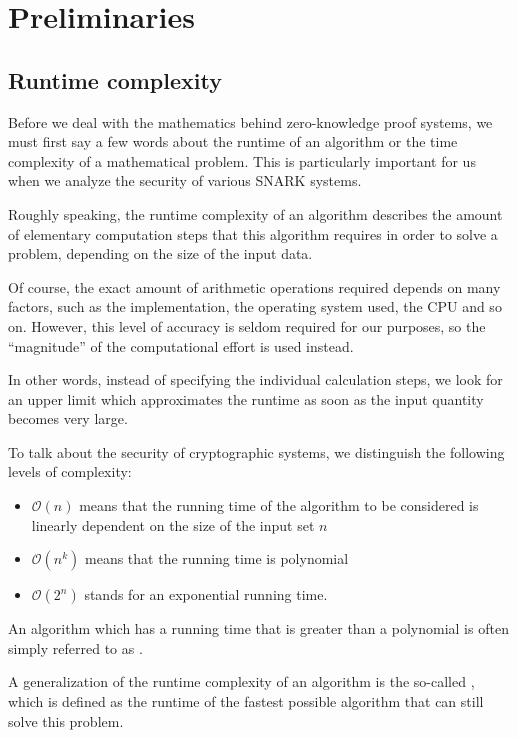 \chapter{Preliminaries}

\section{Runtime complexity}

Before we deal with the mathematics behind zero-knowledge proof systems, we must first say a few words about the runtime of an algorithm or the time complexity of a mathematical problem. This is particularly important for us when we analyze the security of various SNARK systems.

Roughly speaking, the runtime complexity of an algorithm describes the amount of elementary computation steps that this algorithm requires in order to solve a problem, depending on the size of the input data.

Of course, the exact amount of arithmetic operations required depends on many factors, such as the implementation, the operating system used, the CPU and so on. However, this level of accuracy is seldom required for our purposes, so the ``magnitude'' of the computational effort is used instead.

In other words, instead of specifying the individual calculation steps, we look for an upper limit which approximates the runtime as soon as the input quantity becomes very large. 

To talk about the security of cryptographic systems, we distinguish the following levels of complexity:
\begin{itemize}
\item $\mathcal{O}(n)$ means that the running time of the algorithm to be considered is linearly dependent on the size of the input set $n$
\item $\mathcal{O}(n^k)$ means that the running time is polynomial  
\item $\mathcal{O}(2^n) $ stands for an exponential running time. %
\end{itemize} 


An algorithm which has a running time that is greater than a polynomial is often simply referred to as .

A generalization of the runtime complexity of an algorithm is the so-called , which is defined as the runtime of the fastest possible algorithm that can still solve this problem.

